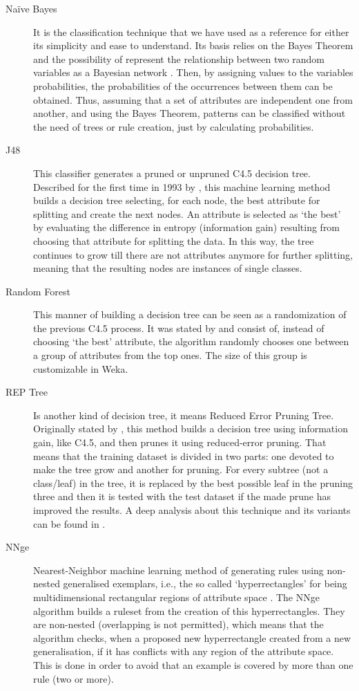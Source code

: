 \begin{description}
  \item[Na\"{i}ve Bayes] It is the classification technique that we have used as a reference for either its simplicity and ease to understand. Its basis relies on the Bayes Theorem and the possibility of represent the relationship between two random variables as a Bayesian network \cite{rish2001empirical}. Then, by assigning values to the variables probabilities, the probabilities of the occurrences between them can be obtained. Thus, assuming that a set of attributes are independent one from another, and using the Bayes Theorem, patterns can be classified without the need of trees or rule creation, just by calculating probabilities.
   \item[J48] This classifier generates a pruned or unpruned C4.5 decision tree. Described for the first time in 1993 by \cite{Quinlan1993}, this machine learning method builds a decision tree selecting, for each node, the best attribute for splitting and create the next nodes. An attribute is selected as `the best' by evaluating the difference in entropy (information gain) resulting from choosing that attribute for splitting the data. In this way, the tree continues to grow till there are not attributes anymore for further splitting, meaning that the resulting nodes are instances of single classes. 
   \item[Random Forest] This manner of building a decision tree can be seen as a randomization of the previous C4.5 process. It was stated by \cite{Breiman2001} and consist of, instead of choosing `the best' attribute, the algorithm randomly chooses one between a group of attributes from the top ones. The size of this group is customizable in Weka.
   \item[REP Tree] Is another kind of decision tree, it means Reduced Error Pruning Tree. Originally stated by \cite{Quinlan1987}, this method builds a decision tree using information gain, like C4.5, and then prunes it using reduced-error pruning. That means that the training dataset is divided in two parts: one devoted to make the tree grow and another for pruning. For every subtree (not a class/leaf) in the tree, it is replaced by the best possible leaf in the pruning three and then it is tested with the test dataset if the made prune has improved the results. A deep analysis about this technique and its variants can be found in \cite{Elomaa2001}.
   \item[NNge] Nearest-Neighbor machine learning method of generating rules using non-nested generalised exemplars, i.e., the so called `hyperrectangles' for being multidimensional rectangular regions of attribute space \cite{Martin1995}. The NNge algorithm builds a ruleset from the creation of this hyperrectangles. They are non-nested (overlapping is not permitted), which means that the algorithm checks, when a proposed new hyperrectangle created from a new generalisation, if it has conflicts with any region of the attribute space. This is done in order to avoid that an example is covered by more than one rule (two or more).

\end{description}
